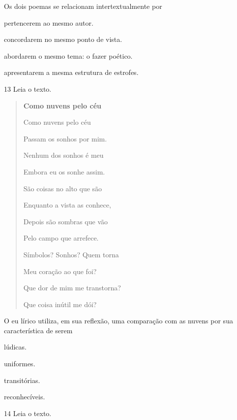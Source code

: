 Os dois poemas se relacionam intertextualmente por

\begin{escolha}
\item pertencerem ao mesmo autor.

\item concordarem no mesmo ponto de vista.

\item abordarem o mesmo tema: o fazer poético.

\item apresentarem a mesma estrutura de estrofes.
\end{escolha}

\num{13} Leia o texto.

\begin{quote}
\textbf{Como nuvens pelo céu}

Como nuvens pelo céu

Passam os sonhos por mim.

Nenhum dos sonhos é meu

Embora eu os sonhe assim.

São coisas no alto que são

Enquanto a vista as conhece,

Depois são sombras que vão

Pelo campo que arrefece.

Símbolos? Sonhos? Quem torna

Meu coração ao que foi?

Que dor de mim me transtorna?

Que coisa inútil me dói?
\end{quote}


O eu lírico utiliza, em sua reflexão, uma comparação com as nuvens por
sua característica de serem

\begin{escolha}
\item lúdicas.

\item uniformes.

\item transitórias.

\item reconhecíveis.
\end{escolha}

\num{14} Leia o texto.

